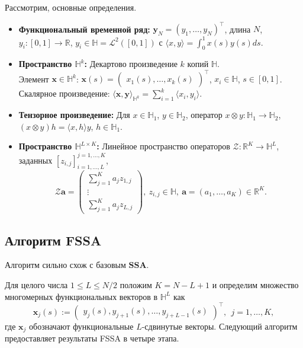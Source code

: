 \documentclass[a4paper, 11pt]{article}
\newcommand{\SSA}{\textbf{SSA}}
\begin{document}
Рассмотрим, основные определения.

\begin{itemize}
    \item \textbf{Функциональный временной ряд:} $\textbf{y}_N=(y_1,\ldots,y_N)^\top$, длина $N$, $y_i:[0,1]\to\mathbb{R}$, $y_i\in\mathbb{H}=\mathcal{L}^2([0,1])$ с $\langle x,y\rangle=\int_0^1 x(s)y(s)ds$.

    \item \textbf{Пространство $\mathbb{H}^k$:} Декартово произведение $k$ копий $\mathbb{H}$. \\ Элемент ${\pmb x}\in\mathbb{H}^k$: ${\pmb x}(s)=\begin{pmatrix} x_1(s),\ldots,x_k(s)\end{pmatrix}^\top$, $x_i\in\mathbb{H}$, $s\in[0,1]$. Скалярное произведение: $\langle\pmb x,\pmb y\rangle_{\mathbb{H}^k}=\sum_{i=1}^k\langle x_i,y_i\rangle$.

    \item \textbf{Тензорное произведение:} Для $x\in\mathbb{H}_1$, $y\in\mathbb{H}_2$, оператор $x\otimes y:\mathbb{H}_1\to\mathbb{H}_2$, $(x\otimes y)h=\langle x,h\rangle y$, $h\in\mathbb{H}_1$.

    \item \textbf{Пространство $\mathbb{H}^{L\times K}$:} Линейное пространство операторов $\mathcal{Z}:\mathbb{R}^K\to\mathbb{H}^L$, заданных $[z_{i,j}]_{i=1,\ldots,L}^{j=1,\ldots,K}$,
    \begin{equation}\label{eq: z operator}
        \mathcal{Z}\pmb{a}=\begin{pmatrix} \sum_{j=1}^K a_j z_{1,j} \\ \vdots \\ \sum_{j=1}^K a_j z_{L,j} \end{pmatrix}, \ z_{i,j}\in\mathbb{H}, \ \pmb{a}=(a_1,\ldots,a_K)\in\mathbb{R}^K.
    \end{equation}

\end{itemize}






\subsection{Алгоритм FSSA}
Алгоритм сильно схож с базовым $\SSA$.

Для целого числа $1\leq L\leq{N}/{2}$ положим $K=N-L+1$ и определим множество многомерных функциональных векторов в $\mathbb{H}^L$ как
\begin{equation}\label{flvec}
	{\pmb x}_j(s):= \begin{pmatrix} y_j(s), y_{j+1}(s), \ldots, y_{j+L-1}(s)\end{pmatrix}^\top,\ \ j=1,\ldots, K,
\end{equation}
где ${\pmb x}_j$ обозначают функциональные $L$-сдвинутые векторы. Следующий алгоритм предоставляет результаты FSSA в четыре этапа.
\end{document}
